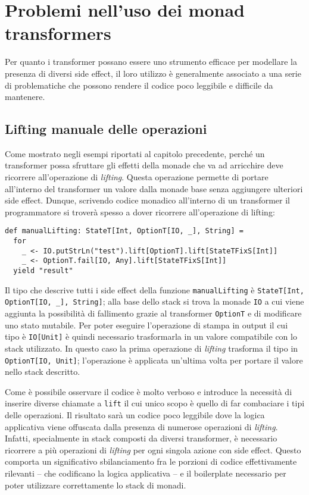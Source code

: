 \section{Problemi nell'uso dei monad transformers}

Per quanto i transformer possano essere uno strumento efficace per modellare la presenza di diversi side effect, il loro utilizzo è generalmente associato a una serie di problematiche che possono rendere il codice poco leggibile e difficile da mantenere.

\subsection{Lifting manuale delle operazioni}
Come mostrato negli esempi riportati al capitolo precedente, perché un transformer possa sfruttare gli effetti della monade che va ad arricchire deve ricorrere all'operazione di \emph{lifting}. Questa operazione permette di portare all'interno del transformer un valore dalla monade base senza aggiungere ulteriori side effect.
Dunque, scrivendo codice monadico all'interno di un transformer il programmatore si troverà spesso a dover ricorrere all'operazione di lifting:
\begin{lstlisting}[language=scala3]
def manualLifting: StateT[Int, OptionT[IO, _], String] =
  for
    _ <- IO.putStrLn("test").lift[OptionT].lift[StateTFixS[Int]]
    _ <- OptionT.fail[IO, Any].lift[StateTFixS[Int]]
  yield "result"
\end{lstlisting}
Il tipo che descrive tutti i side effect della funzione \lstinline{manualLifting} è \lstinline{StateT[Int, OptionT[IO, _], String]}; alla base dello stack si trova la monade \lstinline{IO} a cui viene aggiunta la possibilità di fallimento grazie al transformer \lstinline{OptionT} e di modificare uno stato mutabile.
Per poter eseguire l'operazione di stampa in output il cui tipo è \lstinline{IO[Unit]} è quindi necessario trasformarla in un valore compatibile con lo stack utilizzato. In questo caso la prima operazione di \emph{lifting} trasforma il tipo in \lstinline{OptionT[IO, Unit]}; l'operazione è applicata un'ultima volta per portare il valore nello stack descritto.

Come è possibile osservare il codice è molto verboso e introduce la necessità di inserire diverse chiamate a \lstinline{lift} il cui unico scopo è quello di far combaciare i tipi delle operazioni.
Il risultato sarà un codice poco leggibile dove la logica applicativa viene offuscata dalla presenza di numerose operazioni di \emph{lifting}.
Infatti, specialmente in stack composti da diversi transformer, è necessario ricorrere a più operazioni di \emph{lifting} per ogni singola azione con side effect. Questo comporta un significativo sbilanciamento fra le porzioni di codice effettivamente rilevanti -- che codificano la logica applicativa -- e il boilerplate necessario per poter utilizzare correttamente lo stack di monadi.

